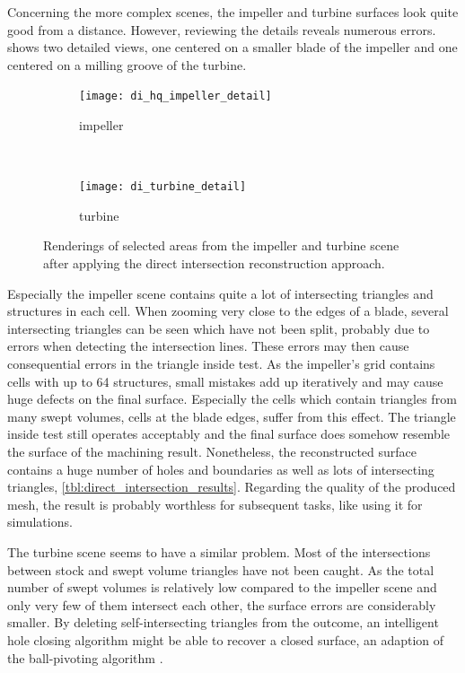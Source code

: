 Concerning the more complex scenes, the impeller and turbine surfaces look quite good from a distance.
However, reviewing the details reveals numerous errors.
 shows two detailed views, one centered on a smaller blade of the impeller and one centered on a milling groove of the turbine.
%
\begin{figure}
	\centering
	\begin{subfigure}[b]{\textwidth}
		\centering
		\texttt{[image: di\_hq\_impeller\_detail]}
		\caption{impeller}
		\label{fig:di_impeller_detail}
	\end{subfigure}\\
	\begin{subfigure}[b]{\textwidth}
		\centering
		\texttt{[image: di\_turbine\_detail]}
		\caption{turbine}
		\label{fig:di_turbine_detail}
	\end{subfigure}
	\caption{
		Renderings of selected areas from the impeller  and turbine  scene after applying the direct intersection reconstruction approach.
	}
	\label{fig:di_scenes_artifacts}
\end{figure}
%
Especially the impeller scene contains quite a lot of intersecting triangles and structures in each cell.
When zooming very close to the edges of a blade, several intersecting triangles can be seen which have not been split, probably due to errors when detecting the intersection lines.
These errors may then cause consequential errors in \eg the triangle inside test.
As the impeller's grid contains cells with up to 64 structures, small mistakes add up iteratively and may cause huge defects on the final surface.
Especially the cells which contain triangles from many swept volumes, \ie cells at the blade edges, suffer from this effect.
The triangle inside test still operates acceptably and the final surface does somehow resemble the surface of the machining result.
Nonetheless, the reconstructed surface contains a huge number of holes and boundaries as well as lots of intersecting triangles, \cf \cref{tbl:direct_intersection_results}.
Regarding the quality of the produced mesh, the result is probably worthless for subsequent tasks, like using it for simulations.

The turbine scene seems to have a similar problem.
Most of the intersections between stock and swept volume triangles have not been caught.
As the total number of swept volumes is relatively low compared to the impeller scene and only very few of them intersect each other, the surface errors are considerably smaller.
By deleting self-intersecting triangles from the outcome, an intelligent hole closing algorithm might be able to recover a closed surface, \eg an adaption of the ball-pivoting algorithm \cite{bpa}.


